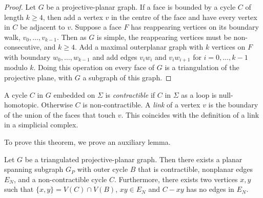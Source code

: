 \begin{proof}
    Let $G$ be a projective-planar graph. If a face is bounded by a cycle $C$ of length $k \geq 4$, then add a vertex $v$ in the centre of the face and have every vertex in $C$ be adjacent to $v$. Suppose a face $F$ has reappearing vertices on its boundary walk, $v_0, \ldots, v_{k-1}$. Then as $G$ is simple, the reappearing vertices must be non-consecutive, and $k \geq 4$. Add a maximal outerplanar graph with $k$ vertices on $F$ with boundary $w_0, \ldots, w_{k-1}$ and add edges $v_i w_i$ and $v_i w_{i + 1}$ for $i = 0, \ldots, {k-1}$ modulo $k$. Doing this operation on every face of $G$ is a triangulation of the projective plane, with $G$ a subgraph of this graph.  
\end{proof}

A cycle $C$ in $G$ embedded on $\Sigma$ is \textit{contractible} if $C$ in $\Sigma$ as a loop is null-homotopic. Otherwise $C$ is non-contractible. 
A \textit{link} of a vertex $v$ is the boundary of the union of the faces that touch $v$. This coincides with the definition of a link in a simplicial complex.

To prove this theorem, we prove an auxiliary lemma. 

\begin{lemma}\label{lem:proj_planar triangulation}
    Let $G$ be a triangulated projective-planar graph. Then there exists a planar spanning subgraph $G_P$ with outer cycle $B$ that is contractible, nonplanar edges $E_N$, and a non-contractible cycle $C$. Furthermore, there exists two vertices $x, y$ such that $\{x, y \} = V(C) \cap V(B)$, $xy \in E_N$ and $C - xy$ has no edges in $E_N$. 
\end{lemma}


